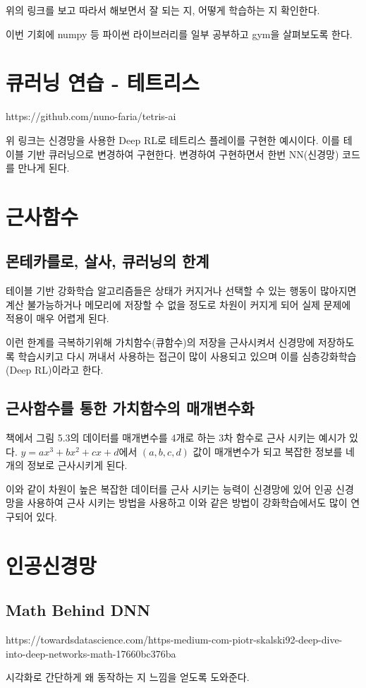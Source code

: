 \documentclass[ %
    a4paper,    %
    amsmath,    %
    itemph,     %
]{oblivoir}     %
\begin{document}
위의 링크를 보고 따라서 해보면서 잘 되는 지, 어떻게 학습하는 지 확인한다. 

이번 기회에 numpy 등 파이썬 라이브러리를 일부 공부하고 gym을 살펴보도록 한다. 

\section{큐러닝 연습 - 테트리스}

https://github.com/nuno-faria/tetris-ai

위 링크는 신경망을 사용한 Deep RL로 테트리스 플레이를 구현한 예시이다. 
이를 테이블 기반 큐러닝으로 변경하여 구현한다. 변경하여 구현하면서 
한번 NN(신경망) 코드를 만나게 된다.  


\section{근사함수}

\subsection{몬테카를로, 살사, 큐러닝의 한계}

테이블 기반 강화학습 알고리즘들은 상태가 커지거나 선택할 수 있는 행동이 
많아지면 계산 불가능하거나 메모리에 저장할 수 없을 정도로 차원이 커지게 되어 
실제 문제에 적용이 매우 어렵게 된다. 

이런 한계를 극복하기위해 가치함수(큐함수)의 저장을 근사시켜서 신경망에 
저장하도록 학습시키고 다시 꺼내서 사용하는 접근이 많이 사용되고 있으며 
이를 심층강화학습(Deep RL)이라고 한다. 

\subsection{근사함수를 통한 가치함수의 매개변수화}

책에서 그림 5.3의 데이터를 매개변수를 4개로 하는 3차 함수로 근사 시키는 
예시가 있다. $y=ax^3 + bx^2 + cx + d$에서 $(a, b, c, d)$ 값이 매개변수가 되고 
복잡한 정보를 네 개의 정보로 근사시키게 된다. 

이와 같이 차원이 높은 복잡한 데이터를 근사 시키는 능력이 신경망에 있어 
인공 신경망을 사용하여 근사 시키는 방법을 사용하고 이와 같은 방법이 
강화학습에서도 많이 연구되어 있다. 


\section{인공신경망}

\subsection{Math Behind DNN}

https://towardsdatascience.com/https-medium-com-piotr-skalski92-deep-dive-into-deep-networks-math-17660bc376ba

시각화로 간단하게 왜 동작하는 지 느낌을 얻도록 도와준다. 
\end{document}
